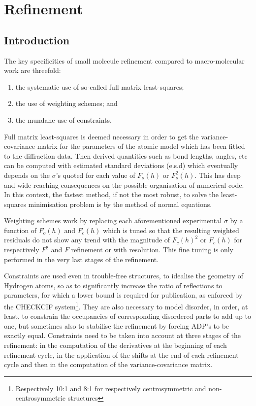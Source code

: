\documentclass[12pt]{article}
\begin{document}
\section{Refinement}
\label{refinement}
\subsection{Introduction}

The key specificities of small molecule refinement compared to macro-molecular work are threefold:
\begin{enumerate}
\item the systematic use of so-called full matrix least-squares;\label{fullmatrix}
\item the use of weighting schemes; and \label{weightingschemes}
\item the mundane use of constraints.\label{constraints}
\end{enumerate}

Full matrix least-squares is deemed necessary in order to get the variance-covariance matrix for the parameters of the atomic model which has been fitted to the diffraction data. Then derived quantities such as bond lengths, angles, etc can be computed with estimated standard deviations (e.s.d) which eventually depends on the $\sigma$'s quoted for each value of $F_o(h)$ or $F_o^2(h)$. This has deep and wide reaching consequences on the possible organisation of numerical code. In this context, the fastest method, if not the most robust, to solve the least-squares minimisation problem is by the method of normal equations.

Weighting schemes work by replacing each aforementioned experimental $\sigma$ by a function of $F_o(h)$ and $F_c(h)$ which is tuned so that the resulting weighted residuals do not show any trend with the magnitude of $F_c(h)^2$ or $F_c(h)$ for respectively $F^2$ and $F$ refinement or with resolution. This fine tuning is only performed in the very last stages of the refinement.

Constraints are used even in trouble-free structures, to idealise the geometry of Hydrogen atoms, so as to significantly increase the ratio of reflections to parameters, for which a lower bound is required for publication, as enforced by the CHECKCIF system\footnote{Respectively 10:1 and 8:1 for respectively centrosymmetric and non-centrosymmetric structures}. They are also necessary to model disorder, in order, at least, to constrain the occupancies of corresponding disordered parts to add up to one, but sometimes also to stabilise the refinement by forcing ADP's to be exactly equal. Constraints need to be taken into account at three stages of the refinement: in the computation of the derivatives at the beginning of each refinement cycle, in the application of the shifts at the end of each refinement cycle and then in the computation of the variance-covariance matrix.
\end{document}
